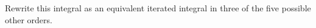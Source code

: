 \documentclass[12pt]{exam}
\begin{document}
\begin{questions}
    Rewrite this integral as an equivalent iterated integral in three of the five possible other orders.
    \begin{solution}
\end{solution}
\end{questions}
\end{document}
